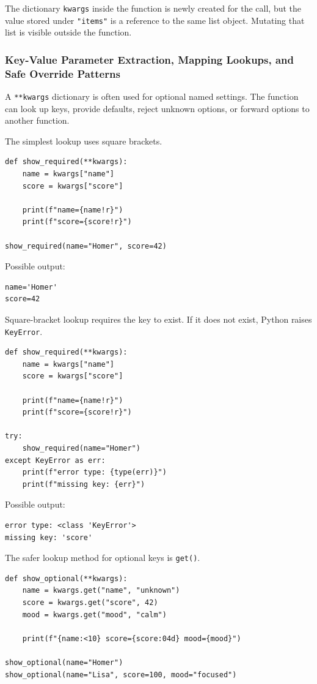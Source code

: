 The dictionary \texttt{kwargs} inside the function is newly created for the call, but the value stored under \texttt{"items"} is a reference to the same list object. Mutating that list is visible outside the function.

\subsubsection{Key-Value Parameter Extraction, Mapping Lookups, and Safe Override Patterns}

A \texttt{**kwargs} dictionary is often used for optional named settings. The function can look up keys, provide defaults, reject unknown options, or forward options to another function.

The simplest lookup uses square brackets.

\begin{verbatim}
def show_required(**kwargs):
    name = kwargs["name"]
    score = kwargs["score"]

    print(f"name={name!r}")
    print(f"score={score!r}")

show_required(name="Homer", score=42)
\end{verbatim}

Possible output:

\begin{verbatim}
name='Homer'
score=42
\end{verbatim}

Square-bracket lookup requires the key to exist. If it does not exist, Python raises \texttt{KeyError}.

\begin{verbatim}
def show_required(**kwargs):
    name = kwargs["name"]
    score = kwargs["score"]

    print(f"name={name!r}")
    print(f"score={score!r}")

try:
    show_required(name="Homer")
except KeyError as err:
    print(f"error type: {type(err)}")
    print(f"missing key: {err}")
\end{verbatim}

Possible output:

\begin{verbatim}
error type: <class 'KeyError'>
missing key: 'score'
\end{verbatim}

The safer lookup method for optional keys is \texttt{get()}.

\begin{verbatim}
def show_optional(**kwargs):
    name = kwargs.get("name", "unknown")
    score = kwargs.get("score", 42)
    mood = kwargs.get("mood", "calm")

    print(f"{name:<10} score={score:04d} mood={mood}")

show_optional(name="Homer")
show_optional(name="Lisa", score=100, mood="focused")
\end{verbatim}


